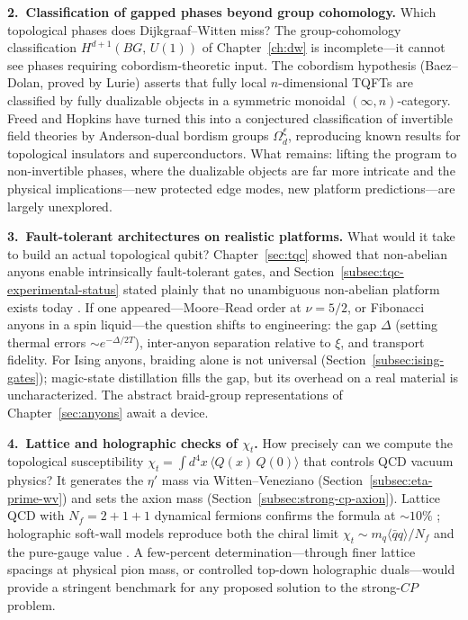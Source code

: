 \medskip
\noindent\textbf{2.\ Classification of gapped phases beyond group cohomology.}
Which topological phases does Dijkgraaf--Witten miss? The group-cohomology classification $H^{d+1}(BG,\,U(1))$ of Chapter~\ref{ch:dw} is incomplete---it cannot see phases requiring cobordism-theoretic input. The cobordism hypothesis (Baez--Dolan, proved by Lurie) asserts that fully local $n$-dimensional TQFTs are classified by fully dualizable objects in a symmetric monoidal $(\infty,n)$-category. Freed and Hopkins have turned this into a conjectured classification of invertible field theories by Anderson-dual bordism groups $\Omega_d^{\xi}$, reproducing known results for topological insulators and superconductors. What remains: lifting the program to non-invertible phases, where the dualizable objects are far more intricate and the physical implications---new protected edge modes, new platform predictions---are largely unexplored.

\medskip
\noindent\textbf{3.\ Fault-tolerant architectures on realistic platforms.}
What would it take to build an actual topological qubit? Chapter~\ref{sec:tqc} showed that non-abelian anyons enable intrinsically fault-tolerant gates, and Section~\ref{subsec:tqc-experimental-status} stated plainly that no unambiguous non-abelian platform exists today \cite{NayakSimonSternFreedmanDasSarma2008NonabelianAnyons}. If one appeared---Moore--Read order at $\nu=5/2$, or Fibonacci anyons in a spin liquid---the question shifts to engineering: the gap $\Delta$ (setting thermal errors $\sim e^{-\Delta/2T}$), inter-anyon separation relative to $\xi$, and transport fidelity. For Ising anyons, braiding alone is not universal (Section~\ref{subsec:ising-gates}); magic-state distillation fills the gap, but its overhead on a real material is uncharacterized. The abstract braid-group representations of Chapter~\ref{sec:anyons} await a device.

\medskip
\noindent\textbf{4.\ Lattice and holographic checks of $\chi_t$.}
How precisely can we compute the topological susceptibility $\chi_t = \int d^4x\,\langle Q(x)\,Q(0)\rangle$ that controls QCD vacuum physics? It generates the $\eta'$ mass via Witten--Veneziano (Section~\ref{subsec:eta-prime-wv}) and sets the axion mass (Section~\ref{subsec:strong-cp-axion}). Lattice QCD with $N_f = 2{+}1{+}1$ dynamical fermions confirms the formula at $\sim\!10\%$ \cite{CichyLatticeWittenVeneziano}; holographic soft-wall models reproduce both the chiral limit $\chi_t \sim m_q\langle\bar{q}q\rangle/N_f$ and the pure-gauge value \cite{AreanU1AHolographicQCD}. A few-percent determination---through finer lattice spacings at physical pion mass, or controlled top-down holographic duals---would provide a stringent benchmark for any proposed solution to the strong-$CP$ problem.

